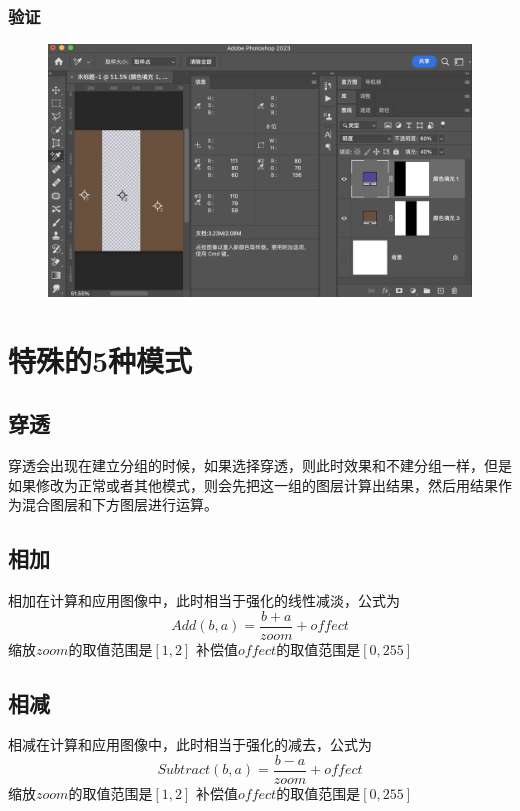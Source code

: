 \subsection{ 验证}
\begin{figure}[h!]
	\centering
	\includegraphics[width=\linewidth]{figure/lum}
	\caption{}
	\label{fig:lum}
\end{figure}
\newpage
\chapter{特殊的5种模式}
\section{ 穿透}
穿透会出现在建立分组的时候，如果选择穿透，则此时效果和不建分组一样，但是如果修改为正常或者其他模式，则会先把这一组的图层计算出结果，然后用结果作为混合图层和下方图层进行运算。
\section{ 相加}
相加在计算和应用图像中，此时相当于强化的线性减淡，公式为
\begin{equation}Add(b,a)= \dfrac{b+a}{zoom}+offect\end{equation}
缩放$zoom$的取值范围是$[1,2]$
补偿值$offect$的取值范围是$[0,255]$
\section{ 相减}
相减在计算和应用图像中，此时相当于强化的减去，公式为
\begin{equation}Subtract(b,a)= \dfrac{b-a}{zoom}+offect\end{equation}
缩放$zoom$的取值范围是$[1,2]$
补偿值$offect$的取值范围是$[0,255]$
